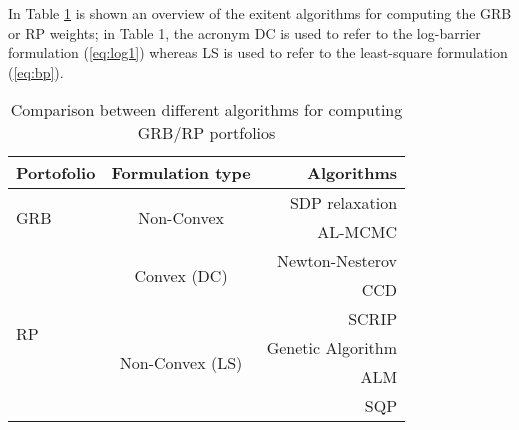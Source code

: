 In Table \ref{tab:t} is shown an overview of the exitent algorithms for computing the GRB or RP weights; in Table 1, the acronym DC is used to refer to the log-barrier formulation (\ref{eq:log1}) whereas LS is used to refer to the least-square formulation (\ref{eq:bp}).
\begin{table}
\begin{center}
\begin{tabular}{| l | c| r |}
\hline
    \textbf{Portofolio} &\textbf{Formulation type}& \textbf{Algorithms}  \\ \hline
    \multirow{2}{4em}{GRB}& \multirow{2}{6em}{Non-Convex}  &SDP relaxation \cite{sdp}  \\ \cline{3-3}
     &  &AL-MCMC \cite{sdp}\\ \hline
    \multirow{7}{4em}{RP}& \multirow{2}{6em}{Convex (DC)}  &Newton-Nesterov \cite{spinu}\\\cline{3-3}     
    &  & CCD \cite{ccd}\\ \cline{2-3}
     &\multirow{4}{8em}{Non-Convex (LS)} & SCRIP \cite{scrip}\\ \cline{3-3}
    && Genetic Algorithm \cite{genetic} \\\cline{3-3}
    && ALM \cite{tutuncu}\\ \cline{3-3}
    && SQP \cite{erc}\\ 
    \hline
\end{tabular}
\end{center}
\caption{Comparison between different algorithms for computing GRB/RP portfolios}
\label{tab:t}
\end{table}
